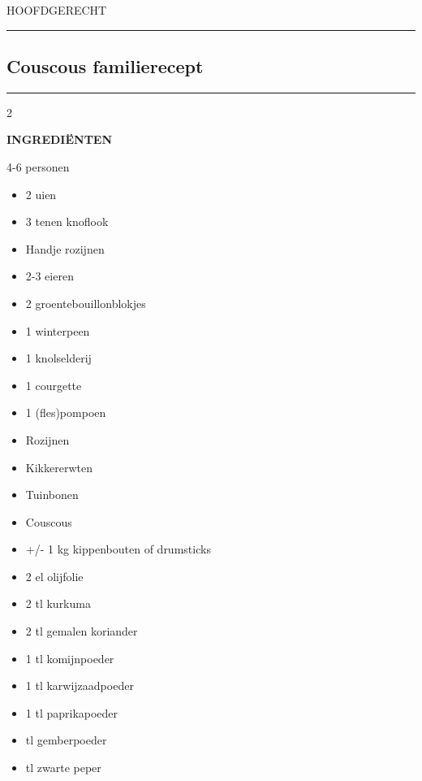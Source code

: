 \newpage

\begin{center}
    \uppercase{Hoofdgerecht}
\end{center}
\rule{\linewidth}{0.4pt}
\subsection{Couscous familierecept}
\rule{\linewidth}{0.4pt}

\hspace{0.5cm}

\begin{paracol}{2}

\uppercase{\textbf{Ingrediënten}}

\hspace{0.25cm}

4-6 personen

\hspace{0.5cm}

\begin{itemize}
    \setlength\itemsep{0em}
    \item 2 uien
    \item 3 tenen knoflook
    \item Handje rozijnen
    \item 2-3 eieren
    \item 2 groentebouillonblokjes
    \item 1 winterpeen
    \item 1 knolselderij
    \item 1 courgette
    \item 1 (fles)pompoen
    \item Rozijnen
    \item Kikkererwten
    \item Tuinbonen
    \item Couscous
    \item +/- 1 kg kippenbouten of drumsticks
    \item 2 el olijfolie
    \item 2 tl kurkuma
    \item 2 tl gemalen koriander
    \item 1 tl komijnpoeder
    \item 1 tl karwijzaadpoeder
    \item 1 tl paprikapoeder
    \item \textonehalf tl gemberpoeder
    \item \textonehalf tl zwarte peper
\end{itemize}


\end{paracol}
